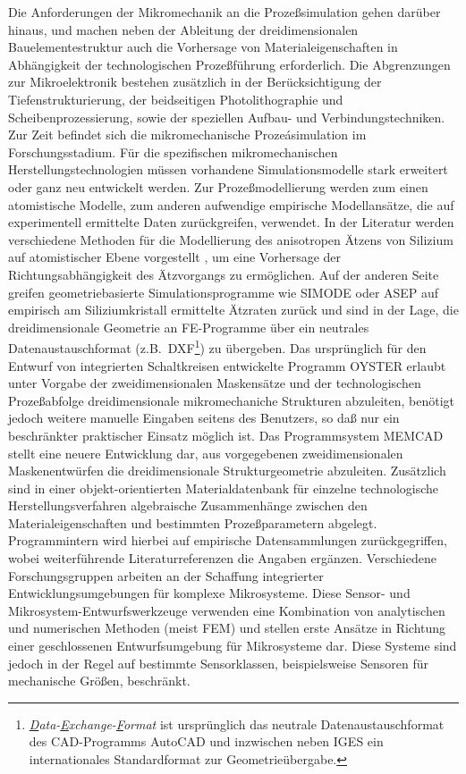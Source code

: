 Die Anforderungen der Mikromechanik an die Prozeßsimulation
gehen darüber hinaus, und machen neben der Ableitung der dreidimensionalen
Bauelementestruktur auch die Vorhersage von Materialeigenschaften in
Abhängigkeit der technologischen Prozeßführung erforderlich.
Die Abgrenzungen zur Mikroelektronik bestehen zusätzlich in
der Berücksichtigung der Tiefenstrukturierung, der beidseitigen
Photolithographie und Scheibenprozessierung, sowie der speziellen Aufbau-
und Verbindungstechniken. Zur Zeit befindet sich die mikromechanische
Prozeásimulation im Forschungsstadium. Für die spezifischen mikromechanischen
Herstellungstechnologien müssen vorhandene Simulationsmodelle stark
erweitert oder ganz neu entwickelt werden. Zur Prozeßmodellierung
werden zum einen atomistische Modelle, %
zum anderen
aufwendige empirische Modellansätze, die auf experimentell ermittelte
Daten zurückgreifen, verwendet. In der Literatur werden verschiedene
Methoden für die Modellierung des anisotropen Ätzens von Silizium
auf atomistischer Ebene vorgestellt \cite{Cam90, Tha94}, um eine Vorhersage
der Richtungsabhängigkeit des Ätzvorgangs zu ermöglichen. Auf der anderen
Seite greifen geometriebasierte Simulationsprogramme wie {\sf SIMODE}
\cite{Fru90} oder {\sf ASEP} \cite{Bus91b} auf empirisch am Siliziumkristall
ermittelte Ätzraten zurück und sind in der Lage, die dreidimensionale
Geometrie an FE-Programme über ein neutrales Datenaustauschformat
(z.B.\ {\sf DXF}\footnote{{\em
\underline{D}ata-\underline{E}xchange-\underline{F}ormat} ist ursprünglich
das neutrale Datenaustauschformat des CAD-Programms {\sf AutoCAD} und
inzwischen neben {\sf IGES} ein internationales Standardformat zur
Geometrieübergabe.}) zu übergeben. Das ursprünglich für den
Entwurf von integrierten Schaltkreisen entwickelte Programm
{\sf OYSTER} \cite{Kop89} erlaubt unter Vorgabe der zweidimensionalen
Maskensätze und der technologischen Prozeßabfolge dreidimensionale
mikromechaniche Strukturen abzuleiten, benötigt jedoch weitere manuelle
Eingaben seitens des Benutzers, so daß nur ein beschränkter praktischer
Einsatz möglich ist. Das Programmsystem {\sf MEMCAD} \cite{Shu91, Sen92}
stellt eine neuere Entwicklung dar, aus
vorgegebenen zweidimensionalen Maskenentwürfen die dreidimensionale
Strukturgeometrie abzuleiten. Zusätzlich sind in einer
objekt-orientierten Materialdatenbank für einzelne technologische
Herstellungsverfahren algebraische Zusammenhänge zwischen den
Materialeigenschaften und bestimmten Prozeßparametern abgelegt.
Programmintern wird hierbei auf empirische Datensammlungen zurückgegriffen,
wobei weiterführende Literaturreferenzen die Angaben
ergänzen. Verschiedene Forschungsgruppen \cite{Cra91a, Joh91, San90}
arbeiten an der Schaffung integrierter Entwicklungsumgebungen für
komplexe Mikrosysteme. Diese Sensor- und Mikrosystem-Entwurfswerkzeuge
verwenden eine Kombination von analytischen und numerischen Methoden
(meist FEM) und stellen erste Ansätze in Richtung einer geschlossenen
Entwurfs\-umgebung für Mikrosysteme dar. Diese Systeme sind jedoch in
der Regel auf bestimmte Sensorklassen, beispielsweise Sensoren für
mechanische Größen, beschränkt.


